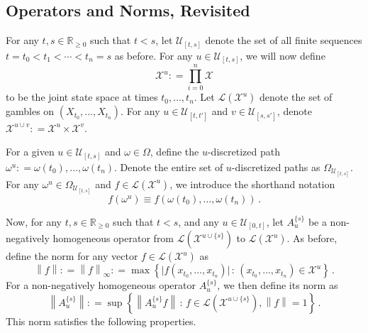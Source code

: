 \documentclass[10pt]{paper}
\newcommand{\reals}{\mathbb{R}}
\newcommand{\realsnonneg}{\reals_{\geq 0}}
\newcommand{\states}{\mathcal{X}}
\newcommand{\gambles}{\mathcal{L}}
\newcommand{\norm}[1]{\left\lVert #1 \right\rVert}
\newcommand{\coloneqq}{:\!=}
\begin{document}
\subsection{Operators and Norms, Revisited}
For any $t,s \in \realsnonneg$ such that $t < s$, let $\mathcal{U}_{[t,s]}$ denote the set of all finite sequences $t=t_0 < t_1 < \cdots < t_n=s$ as before. For any $u\in\mathcal{U}_{[t,s]}$, we will now define
\begin{equation*}
\states^u\coloneqq \prod_{i=0}^n\states
\end{equation*}
to be the joint state space at times $t_0,\ldots,t_n$. Let $\gambles(\states^u)$ denote the set of gambles on $(X_{t_0},\ldots,X_{t_n})$. For any $u\in\mathcal{U}_{[t,t']}$ and $v\in\mathcal{U}_{[s,s']}$, denote $\states^{u\cup v}\coloneqq\states^u\times\states^v$.

For a given $u\in\mathcal{U}_{[t,s]}$ and $\omega\in\Omega$, define the $u$-discretized path $\omega^u\coloneqq \omega(t_0),\ldots,\omega(t_n)$. Denote the entire set of $u$-discretized paths as $\Omega_{\mathcal{U}_{[t,s]}}$. For any $\omega^u\in\Omega_{\mathcal{U}_{[t,s]}}$ and $f\in\gambles(\states^u)$, we introduce the shorthand notation
\begin{equation*}
f(\omega^u) \equiv f(\omega(t_0),\ldots,\omega(t_n))\,.
\end{equation*}

Now, for any $t,s\in\realsnonneg$ such that $t<s$, and any $u\in\mathcal{U}_{[0,t]}$, let $A_u^{\{s\}}$ be a non-negatively homogeneous operator from $\gambles(\states^{u\cup \{s\}})$ to $\gambles(\states^u)$.
As before, define the norm for any vector $f\in\gambles(\states^u)$ as
\begin{equation*}
\norm{f}\coloneqq\norm{f}_\infty\coloneqq\max\left\{\bigl\vert f(x_{t_0},\ldots,x_{t_n})\bigr\vert\,:\,(x_{t_0},\ldots,x_{t_n})\in\states^u\right\}\,.
\end{equation*}
For a non-negatively homogeneous operator $A_u^{\{s\}}$, we then define its norm as
\begin{equation*}
\norm{A_u^{\{s\}}} \coloneqq \sup\left\{ \norm{A_u^{\{s\}}f}\,:\,f\in\gambles(\states^{u\cup \{s\}}),\norm{f}=1 \right\}\,.
\end{equation*}
This norm satisfies the following properties. 
\end{document}
